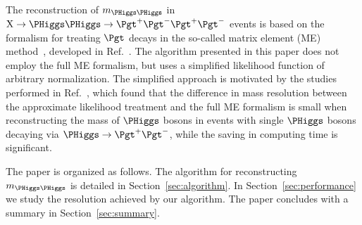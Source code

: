 The reconstruction of $m_{\PHiggs\PHiggs}$ in $\textrm{X} \to \PHiggs\PHiggs \to \Pgt^{+}\Pgt^{-}\Pgt^{+}\Pgt^{-}$ events is
based on the formalism for treating $\Pgt$ decays in the so-called matrix element (ME) method~\cite{Kondo:1988yd,Kondo:1991dw},
developed in Ref.~\cite{SVfitMEM}.
The algorithm presented in this paper does not employ the full ME formalism,
but uses a simplified likelihood function of arbitrary normalization.
The simplified approach is motivated by the studies performed in Ref.~\cite{SVfitMEM}, 
which found that the difference in mass resolution between the approximate likelihood treatment and the full ME formalism 
is small when reconstructing the mass of $\PHiggs$ bosons in events with single $\PHiggs$ bosons decaying via $\PHiggs \to \Pgt^{+}\Pgt^{-}$,
while the saving in computing time is significant.

The paper is organized as follows. 
The algorithm for reconstructing $m_{\PHiggs\PHiggs}$ is detailed in Section~\ref{sec:algorithm}.
In Section~\ref{sec:performance} we study the resolution achieved by our algorithm.
The paper concludes with a summary in Section~\ref{sec:summary}.
